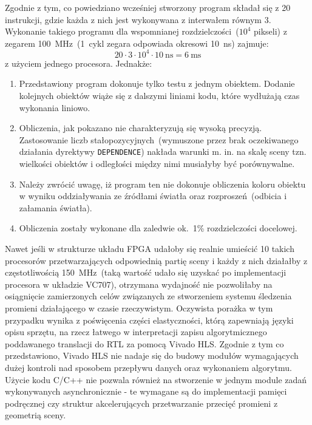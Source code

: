 Zgodnie z tym, co powiedziano wcześniej stworzony program składał się z 20 instrukcji, gdzie każda z nich jest wykonywana z interwałem równym 3. Wykonanie takiego programu dla wspomnianej rozdzielczości~($10^4$ pikseli) z zegarem 100~MHz~(1~cykl zegara odpowiada okresowi 10~ns) zajmuje:
\begin{equation}
20\cdot 3 \cdot 10^4 \cdot 10\ \mathrm{ns} = 6\ \mathrm{ms}
\end{equation}
z użyciem jednego procesora. Jednakże:
\begin{enumerate}
\item Przedstawiony program dokonuje tylko testu z jednym obiektem. Dodanie kolejnych obiektów wiąże się z dalszymi liniami kodu, które wydłużają czas wykonania liniowo.
\item Obliczenia, jak pokazano nie charakteryzują się wysoką precyzją. Zastosowanie liczb stałopozycyjnych~(wymuszone przez brak oczekiwanego działania dyrektywy \texttt{DEPENDENCE}) nakłada warunki m. in. na skalę sceny tzn. wielkości obiektów i odległości między nimi musiałyby być porównywalne.
\item Należy zwrócić uwagę, iż program ten nie dokonuje obliczenia koloru obiektu w wyniku oddziaływania ze źródłami światła oraz rozproszeń~(odbicia i załamania światła).
\item Obliczenia zostały wykonane dla zaledwie ok.~1\% rozdzielczości docelowej.
\end{enumerate}
Nawet jeśli w strukturze układu FPGA udałoby się realnie umieścić 10 takich procesorów przetwarzających odpowiednią partię sceny i każdy z nich działałby z częstotliwością 150~MHz~(taką wartość udało się uzyskać po implementacji procesora w układzie VC707), otrzymana wydajność nie pozwoliłaby na osiągnięcie zamierzonych celów związanych ze stworzeniem systemu śledzenia promieni działającego w czasie rzeczywistym. Oczywista porażka w tym przypadku wynika z poświęcenia części elastyczności, którą zapewniają języki opisu sprzętu, na rzecz łatwego w interpretacji zapisu algorytmicznego poddawanego translacji do RTL za pomocą Vivado HLS. Zgodnie z tym co przedstawiono, Vivado HLS nie nadaje się do budowy modułów wymagających dużej kontroli nad sposobem przepływu danych oraz wykonaniem algorytmu. Użycie kodu C/C++ nie pozwala również na stworzenie w jednym module zadań wykonywanych asynchronicznie - te wymagane są do implementacji pamięci podręcznej czy struktur akcelerujących przetwarzanie przecięć promieni z geometrią sceny.

